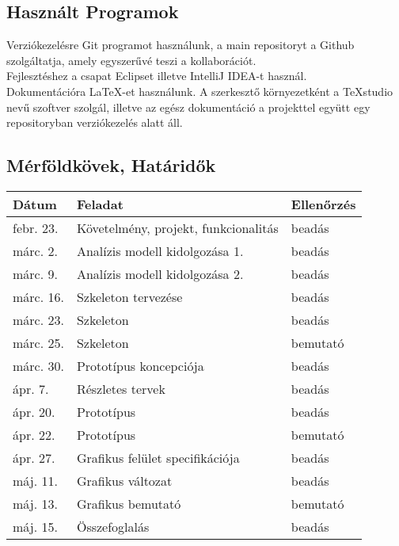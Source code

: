\subsection{Használt Programok}

 Verziókezelésre Git programot használunk, a main repositoryt a Github szolgáltatja, amely egyszerűvé teszi a kollaborációt.\\

Fejlesztéshez a csapat Eclipset illetve IntelliJ IDEA-t használ.\\

Dokumentációra LaTeX-et használunk. A szerkesztő környezetként a TeXstudio nevű szoftver szolgál, illetve az egész dokumentáció a projekttel együtt egy repositoryban verziókezelés alatt áll.\\

\subsection{Mérföldkövek, Határidők}

\begin{center}
	\begin{tabular}{ | l | l | l | }
		\hline
		\textbf{Dátum} &
		\textbf{Feladat} &
		\textbf{Ellenőrzés}
		
		\\ \hline \hline
		febr. 23. & Követelmény, projekt, funkcionalitás & beadás
		\\ \hline 
		márc. 2. &	Analízis modell kidolgozása 1. & beadás
		\\ \hline 
		márc. 9. &	Analízis modell kidolgozása 2. & beadás
		\\ \hline 
		márc. 16. &	Szkeleton tervezése & beadás
		\\ \hline 		
		márc. 23. &	Szkeleton & beadás
		\\ \hline
		márc. 25. & Szkeleton & bemutató
		\\ \hline 
		márc. 30. &	Prototípus koncepciója & beadás
		\\ \hline 
		ápr. 7.	 & Részletes tervek & beadás
		\\ \hline 
		ápr. 20. &	Prototípus & beadás
		\\ \hline 
		ápr. 22. & Prototípus & bemutató
		\\ \hline
		ápr. 27. &	Grafikus felület specifikációja & beadás
		\\ \hline 	 
		máj. 11. &	Grafikus változat & beadás
		\\ \hline
		máj. 13. & Grafikus bemutató & bemutató
		\\ \hline
		máj. 15. &	Összefoglalás & beadás
		\\ \hline 
	\end{tabular}
\end{center}


